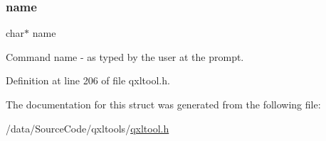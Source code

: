 \subsubsection{\texorpdfstring{name}{name}}
{\footnotesize\ttfamily char$\ast$ name}

Command name -\/ as typed by the user at the prompt. 

Definition at line 206 of file qxltool.\+h.



The documentation for this struct was generated from the following file\+:\begin{DoxyCompactItemize}
\item 
/data/\+Source\+Code/qxltools/\hyperlink{qxltool_8h}{qxltool.\+h}\end{DoxyCompactItemize}
